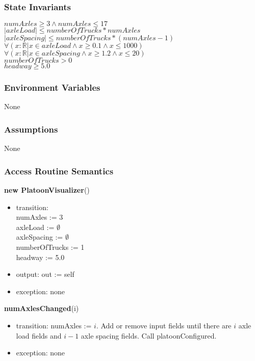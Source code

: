\documentclass[12pt, titlepage]{article}
\begin{document}
\subsubsection{State Invariants}
$numAxles \geq 3 \land numAxles \leq 17$\\
$|axleLoad| \leq numberOfTrucks * numAxles$\\
$|axleSpacing| \leq numberOfTrucks * (numAxles - 1)$\\
$\forall(x : \mathbb{R} | x \in axleLoad \land x \geq 0.1 \land x \leq 1000)$\\
$\forall(x : \mathbb{R} | x \in axleSpacing \land x \geq 1.2 \land x \leq 20)$\\
$numberOfTrucks > 0$\\
$headway \geq 5.0$
\subsubsection{Environment Variables}
None
\subsubsection{Assumptions}
None
\subsubsection{Access Routine Semantics}

\noindent \textbf{new PlatoonVisualizer}()
\begin{itemize}
\item transition: \\
		numAxles := 3\\
		axleLoad := $\emptyset$\\
		axleSpacing := $\emptyset$\\
		numberOfTrucks := 1\\
		headway := 5.0
\item output: out := self
\item exception: none
\end{itemize}

\noindent \textbf{numAxlesChanged}(i)
\begin{itemize}
\item transition: numAxles := $i$. Add or remove input fields until there are $i$ axle load fields and $i-1$ axle spacing fields. Call platoonConfigured.
\item exception: none
\end{itemize}
\end{document}
